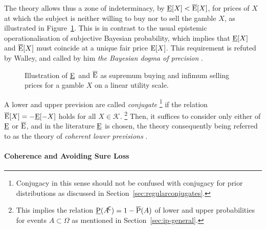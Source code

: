 The theory allows thus a zone of indeterminacy, by $\underline{\operatorname{E}}[X] < \overline{\operatorname{E}}[X]$,
for prices of $X$ at which the subject is neither willing to buy nor to sell the gamble $X$,
as illustrated in Figure~\ref{fig:pricesforgambles}.
This is in contrast to the usual epistemic operationalisation of subjective Bayesian probability,
which implies that $\underline{\operatorname{E}}[X]$ and $\overline{\operatorname{E}}[X]$ must coincide at a unique fair price $\operatorname{E}[X]$.
This requirement is refuted by Walley, and called by him \emph{the Bayesian dogma of precision}
\parencite[\S 5]{1991:walley}.

\begin{figure}
\centering
{}
\caption{\label{fig:pricesforgambles}%
Illustration of \underline{E}\ and $\overline{\operatorname{E}}$ as supremum buying and infimum selling prices for a gamble $X$ on a linear utility scale.}
\end{figure}

A lower and upper prevision are called \emph{conjugate}%
\footnote{Conjugacy in this sense should not be confused
with conjugacy for prior distributions as discussed in Section~\ref{sec:regularconjugates}.}
if the relation $\overline{\operatorname{E}}[X] = -\underline{\operatorname{E}}[-X]$ holds for all $X \in \mathcal{K}$.%
\footnote{This implies the relation $\underline{\operatorname{P}}(A^{{\mbox{\!\scriptsize\textsf{C}}}}) = 1 - \overline{\operatorname{P}}(A)$
of lower and upper probabilities for events $A \subset \Omega$
as mentioned in Section~\ref{sec:ip-general}.}
Then, it suffices to consider only either of $\underline{\operatorname{E}}$ or $\overline{\operatorname{E}}$,
and in the literature $\underline{\operatorname{E}}$ is chosen,
the theory consequently being referred to as the theory of
\emph{coherent lower previsions} \parencite[see, e.g.,][\S 3.2]{itip}.

\paragraph{Coherence and Avoiding Sure Loss}


